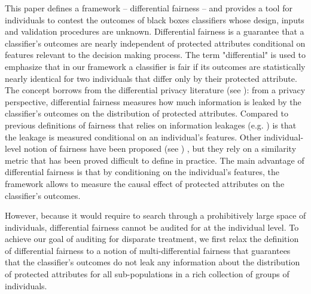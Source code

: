 \documentclass{article}
\begin{document}
  This paper defines a framework -- differential fairness -- and provides a tool for individuals to contest the outcomes of black boxes classifiers whose design, inputs and validation procedures are unknown. Differential fairness is a guarantee that a classifier's outcomes are nearly independent of protected attributes conditional on features relevant to the decision making process. The term "differential" is used to emphasize that in our framework a classifier is fair if its outcomes are statistically nearly identical for two individuals that differ only by their protected attribute. The concept borrows from the differential privacy literature (see \cite{dwork2014algorithmic}): from a privacy perspective, differential fairness  measures how much information is leaked by the classifier's outcomes on the distribution of protected attributes. Compared to previous definitions of fairness that relies on information leakages (e.g. \cite{feldman2015certifying}) is that the leakage is measured conditional on an individual's features. Other individual-level notion of fairness have been proposed (see \cite{dwork2012fairness}) , but they rely on a similarity metric that has been proved difficult to define in practice. The main advantage of differential fairness is that by conditioning on the individual's features, the framework allows to  measure the causal effect of protected attributes on the classifier's outcomes. 
 
 \bigskip
 However, because it would require to search through a prohibitively large space of individuals, differential fairness cannot be audited for at the individual level. To achieve our goal of auditing for disparate treatment, we first relax the definition of differential fairness to a notion of multi-differential fairness that guarantees that the classifier's outcomes do not leak any information about the distribution of protected attributes for all sub-populations in a rich collection of groups of individuals. 
 
\end{document}
